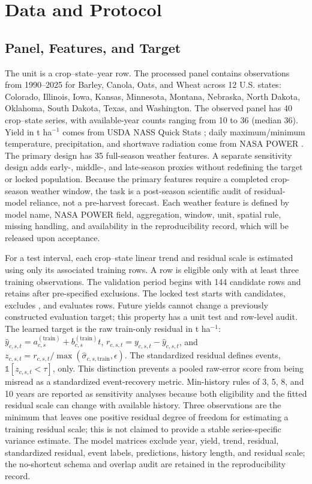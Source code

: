 \documentclass[conference]{IEEEtran}
\begin{document}
\section{Data and Protocol}
\subsection{Panel, Features, and Target}
The unit is a crop--state--year row. The processed panel contains \AuditTotalRows{}
observations from 1990--2025 for Barley, Canola, Oats, and Wheat across 12 U.S.
states: Colorado, Illinois, Iowa, Kansas, Minnesota, Montana, Nebraska, North
Dakota, Oklahoma, South Dakota, Texas, and Washington. The observed panel has 40
crop--state series, with available-year counts ranging from 10 to 36 (median 36).
Yield in t ha$^{-1}$ comes from USDA NASS Quick Stats
\cite{USDANASSQuickStats}; daily maximum/minimum temperature, precipitation, and
shortwave radiation come from NASA POWER \cite{NASAPOWER2026}. The primary design
has 35 full-season weather features. A separate sensitivity design adds early-,
middle-, and late-season proxies without redefining the target or locked population.
Because the primary features require a completed crop-season weather window, the
task is a post-season scientific audit of residual-model reliance, not a
pre-harvest forecast. Each weather feature is defined by model name, NASA POWER
field, aggregation, window, unit, spatial rule, missing handling, and availability
in the reproducibility record, which will be released upon acceptance.

For a test interval, each crop--state linear trend and residual scale is estimated
using only its associated training rows. A row is eligible only with at least three
training observations. The validation period begins with 144 candidate rows and
retains \AuditValidationRows{} after \AuditValidationExcluded{} pre-specified
exclusions. The locked test starts with \AuditTestCandidateRows{} candidates,
excludes \AuditTestExcluded{}, and evaluates \AuditTestRows{} rows. Future yields
cannot change a previously
constructed evaluation target; this property has a unit test and row-level audit.
The learned target is the raw train-only residual in t ha$^{-1}$:
$\hat{y}_{c,s,t}=a^{(\mathrm{train})}_{c,s}+b^{(\mathrm{train})}_{c,s}t$,
$r_{c,s,t}=y_{c,s,t}-\hat{y}_{c,s,t}$, and
$z_{c,s,t}=r_{c,s,t}/\max(\hat{\sigma}_{c,s,\mathrm{train}},\epsilon)$.
The standardized residual defines events, $\mathbb{1}[z_{c,s,t}<\tau]$, only.
This distinction prevents a pooled raw-error score from being misread as a
standardized event-recovery metric. Min-history rules of 3, 5, 8, and 10 years are
reported as sensitivity analyses because both eligibility and the fitted residual
scale can change with available history. Three observations are the minimum that
leaves one positive residual degree of freedom for estimating a training residual
scale; this is not claimed to provide a stable series-specific variance estimate.
The model matrices exclude year, yield, trend, residual, standardized residual,
event labels, predictions, history length, and residual scale; the no-shortcut
schema and overlap audit are retained in the reproducibility record.
\end{document}
